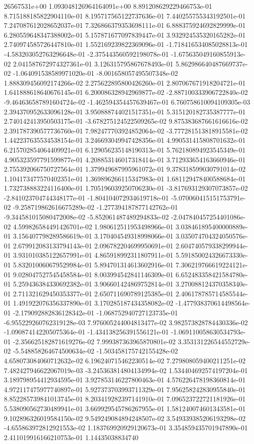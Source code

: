 26567531e+00	1.093048126964164091e+00	8.891208629229466753e-01	8.715188185822904110e-01	8.195717565122737636e-01	7.440255755343192501e-01	7.247087612028652037e-01	7.326866379353698111e-01	6.888375924692829999e-01	6.280559648347388002e-01	5.157871677097839447e-01	3.932924535320165282e-01	2.740974585726447810e-01	1.552169239822369096e-01	-1.718416534085028813e-01	-4.583203052763296648e-01	-2.375443560592198078e-01	-1.675635049160855913e-02	2.041587672974327361e-01	3.126315795867678493e-01	5.862986640487669737e-02	-1.064091538589971020e-01	-8.001658057495507348e-02	1.888309456092174266e-02	2.275622895800426260e-01	2.807067671918204721e-01	1.641888618640676145e-01	6.200086328942969877e-02	-2.887100333906722840e-02	-9.464636587891604724e-02	-1.462594354457639467e-01	6.760758610094109305e-03	2.394370952633096128e-01	3.950888744021517351e-01	5.315120182735387777e-01	2.740142413950503175e-01	-3.678275124522509265e-02	9.875383687661616616e-02	2.391787390577736760e-01	7.982477703924852064e-02	-3.777281513818915581e-02	1.442237635534538154e-01	3.246693049947428356e-01	4.990531415808701632e-01	6.215702854064409921e-01	6.129056235148190313e-01	5.762180894923545349e-01	4.905323597791599877e-01	4.208853146017318414e-01	3.712933654163660946e-01	2.755392066750727564e-01	1.379949687995961072e-01	9.378318599030791014e-02	1.104173477570402351e-01	1.369896266115347983e-01	1.681129478400588684e-01	1.732738883224116400e-01	1.705196039250706230e-01	-3.817693129307073857e-02	-2.841023704744348177e-01	-1.804104072934619718e-01	-5.070060415151753791e-02	-9.258719862616675289e-02	-1.277394187877142762e-01	-9.344581015080472008e-02	-5.852061487489294833e-02	-2.047840457254401086e-02	4.599826584491426701e-02	1.980612511953498966e-01	3.038461895400000889e-01	3.156407798289586619e-01	3.170404549318998066e-01	3.035074704324050576e-01	2.679912083133794143e-01	2.096782204699950691e-01	2.604740579338299944e-01	3.931010385122657991e-01	4.865918992311807911e-01	5.591850024326673330e-01	5.832010060679529984e-01	5.894701314613602916e-01	7.306219766619224121e-01	9.028047527545458584e-01	8.003994542841146309e-01	6.652483358421584780e-01	5.259436384330692382e-01	3.906601424869752814e-01	3.270088124370358340e-01	2.711321629450353377e-01	2.650711690789125385e-01	2.406178785714585544e-01	1.491922076356337890e-01	3.170285187434358082e-02	-1.477938370614498564e-01	-2.179092882836128342e-01	-1.068752940727123735e-01	-6.955229260762319128e-03	7.976005244004813477e-02	3.982573828784430336e-02	-1.090874142205075364e-01	-1.434138256391556121e-01	-1.069110058630534793e-01	-2.356625182871619276e-02	7.999387363965870801e-02	3.353131226544552729e-02	-5.548858264674500634e-02	-1.503458175742155428e-02	4.658073084060712632e-02	6.196240715462230514e-02	7.279808059400211251e-02	7.482427946622067019e-03	-3.245363814804134994e-02	1.534404692574197204e-01	3.189798954412934595e-01	3.927853146227800463e-01	4.576226478198360814e-01	4.972117475977740897e-01	5.927373703993711329e-01	7.956258242830955840e-01	8.852285739841013745e-01	8.203419282397141910e-01	7.096523722721181926e-01	5.538090562730489941e-01	3.669929545786267955e-01	1.581240074601343581e-01	9.102896326019584150e-02	9.549249084894248507e-02	3.549339385206193298e-02	-4.655863972812921553e-02	1.183769920929120673e-01	3.354859435701947890e-01	2.411019916166210753e-01	1.14435038834740